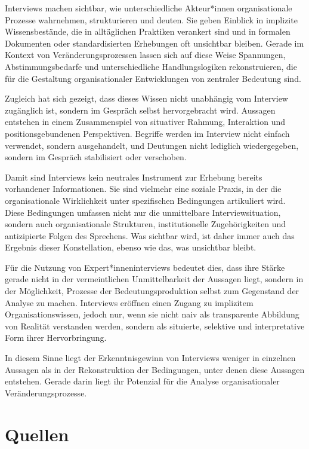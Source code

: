 \documentclass[a4paper,
fontsize=11pt,
oneside,
numbers=noperiodatend,
parskip=half-,
bibliography=totoc,
final
]{scrartcl}
\begin{document}
Interviews machen sichtbar, wie unterschiedliche Akteur*innen
organisationale Prozesse wahrnehmen, strukturieren und deuten. Sie geben
Einblick in implizite Wissensbestände, die in alltäglichen Praktiken
verankert sind und in formalen Dokumenten oder standardisierten
Erhebungen oft unsichtbar bleiben. Gerade im Kontext von
Veränderungsprozessen lassen sich auf diese Weise Spannungen,
Abstimmungsbedarfe und unterschiedliche Handlungslogiken rekonstruieren,
die für die Gestaltung organisationaler Entwicklungen von zentraler
Bedeutung sind.

Zugleich hat sich gezeigt, dass dieses Wissen nicht unabhängig vom
Interview zugänglich ist, sondern im Gespräch selbst hervorgebracht
wird. Aussagen entstehen in einem Zusammenspiel von situativer Rahmung,
Interaktion und positionsgebundenen Perspektiven. Begriffe werden im
Interview nicht einfach verwendet, sondern ausgehandelt, und Deutungen
nicht lediglich wiedergegeben, sondern im Gespräch stabilisiert oder
verschoben.

Damit sind Interviews kein neutrales Instrument zur Erhebung bereits
vorhandener Informationen. Sie sind vielmehr eine soziale Praxis, in der
die organisationale Wirklichkeit unter spezifischen Bedingungen
artikuliert wird. Diese Bedingungen umfassen nicht nur die unmittelbare
Interviewsituation, sondern auch organisationale Strukturen,
institutionelle Zugehörigkeiten und antizipierte Folgen des Sprechens.
Was sichtbar wird, ist daher immer auch das Ergebnis dieser
Konstellation, ebenso wie das, was unsichtbar bleibt.

Für die Nutzung von Expert*inneninterviews bedeutet dies, dass ihre
Stärke gerade nicht in der vermeintlichen Unmittelbarkeit der Aussagen
liegt, sondern in der Möglichkeit, Prozesse der Bedeutungsproduktion
selbst zum Gegenstand der Analyse zu machen. Interviews eröffnen einen
Zugang zu implizitem Organisationswissen, jedoch nur, wenn sie nicht
naiv als transparente Abbildung von Realität verstanden werden, sondern
als situierte, selektive und interpretative Form ihrer Hervorbringung.

In diesem Sinne liegt der Erkenntnisgewinn von Interviews weniger in
einzelnen Aussagen als in der Rekonstruktion der Bedingungen, unter
denen diese Aussagen entstehen. Gerade darin liegt ihr Potenzial für die
Analyse organisationaler Veränderungsprozesse.

\section{Quellen}\label{quellen}
\end{document}
